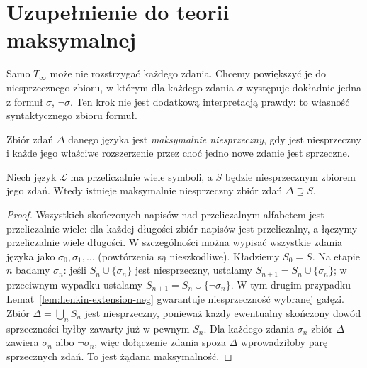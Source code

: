 \section{Uzupełnienie do teorii maksymalnej}\label{sec:henkin-lindenbaum}
Samo $T_{\infty}$ może nie rozstrzygać każdego zdania. Chcemy powiększyć je do niesprzecznego zbioru, w którym dla każdego zdania $\sigma$ występuje dokładnie jedna z formuł $\sigma$, $\neg\sigma$. Ten krok nie jest dodatkową interpretacją prawdy: to własność syntaktycznego zbioru formuł.

\begin{definicja}\label{def:henkin-max-consistent}
Zbiór zdań $\Delta$ danego języka jest \emph{maksymalnie niesprzeczny}, gdy jest niesprzeczny i każde jego właściwe rozszerzenie przez choć jedno nowe zdanie jest sprzeczne.
\end{definicja}

\begin{lemat}\label{lem:henkin-lindenbaum-countable}
Niech język $\mathcal L$ ma przeliczalnie wiele symboli, a $S$ będzie niesprzecznym zbiorem jego zdań. Wtedy istnieje maksymalnie niesprzeczny zbiór zdań $\Delta\supseteq S$.
\end{lemat}
\begin{proof}
Wszystkich skończonych napisów nad przeliczalnym alfabetem jest przeliczalnie wiele: dla każdej długości zbiór napisów jest przeliczalny, a łączymy przeliczalnie wiele długości. W szczególności można wypisać wszystkie zdania języka jako $\sigma_0,\sigma_1,\ldots$ (powtórzenia są nieszkodliwe). Kładziemy $S_0=S$. Na etapie $n$ badamy $\sigma_n$: jeśli $S_n\cup\{\sigma_n\}$ jest niesprzeczny, ustalamy $S_{n+1}=S_n\cup\{\sigma_n\}$; w przeciwnym wypadku ustalamy $S_{n+1}=S_n\cup\{\neg\sigma_n\}$. W tym drugim przypadku Lemat~\ref{lem:henkin-extension-neg} gwarantuje niesprzeczność wybranej gałęzi. Zbiór $\Delta=\bigcup_n S_n$ jest niesprzeczny, ponieważ każdy ewentualny skończony dowód sprzeczności byłby zawarty już w pewnym $S_n$. Dla każdego zdania $\sigma_n$ zbiór $\Delta$ zawiera $\sigma_n$ albo $\neg\sigma_n$, więc dołączenie zdania spoza $\Delta$ wprowadziłoby parę sprzecznych zdań. To jest żądana maksymalność.
\end{proof}

